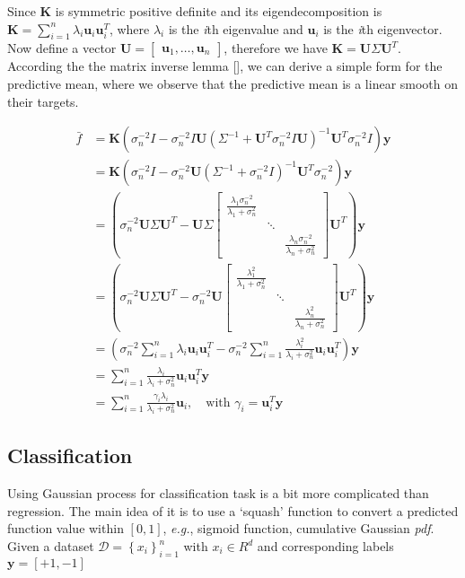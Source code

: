\documentclass{article}
\newcommand{\eg}{\emph{e.g.}}
\newcommand{\vct}[1]{\ensuremath{\boldsymbol{#1}}} %
\newcommand{\set}[1]{\ensuremath{\mathcal{#1}}}
\newcommand{\bmat}[1]{\begin{bmatrix}#1\end{bmatrix}}
\begin{document}
Since $ \vct K $ is symmetric positive definite and its eigendecomposition is $ \vct K=\sum_{i=1}^n \lambda_i\vct u_i \vct u_i^T$, where $ \lambda_i $ is the \textit{i}th eigenvalue and $ \vct u_i $ is the \textit{i}th eigenvector. Now define a vector $ \vct U=\bmat{\vct u_1, \ldots, \vct u_n} $, therefore we have $ \vct K = \vct U\Sigma\vct U^T $. According the the matrix inverse lemma [\cite{mil86}], we can derive a simple form for the predictive mean, where we observe that the predictive mean is a linear smooth on their targets. 

\begin{align*}
\bar{f} & = \vct K\left( \sigma_n^{-2}I - \sigma_n^{-2}I\vct U \left( \Sigma^{-1}+\vct U^T\sigma_n^{-2}I\vct U \right)^{-1}\vct U^T\sigma_n^{-2}I\right)\vct y \\
& = \vct K\left( \sigma_n^{-2}I - \sigma_n^{-2}\vct U \left( \Sigma^{-1}+\sigma_n^{-2}I \right)^{-1}\vct U^T\sigma_n^{-2}\right)\vct y \\
& = \left( \sigma_n^{-2}\vct U\Sigma\vct U^T - \vct U\Sigma
			\bmat{\frac{\lambda_1\sigma_n^{-2}}{\lambda_1+\sigma_n^{2}} & & \\ 
						& \ddots & \\ 
						& & \frac{\lambda_n\sigma_n^{-2}}{\lambda_n+\sigma_n^{2}}}
		\vct U^T \right)\vct y \\
& = \left( \sigma_n^{-2}\vct U\Sigma\vct U^T - \sigma_n^{-2}\vct U
\bmat{\frac{\lambda_1^2}{\lambda_1+\sigma_n^{2}} & & \\ 
	& \ddots & \\ 
	& & \frac{\lambda_n^2}{\lambda_n+\sigma_n^{2}}}
\vct U^T \right)\vct y \\
& = \left( \sigma_n^{-2}\sum_{i=1}^n\lambda_i\vct u_i\vct u_i^T - \sigma_n^{-2}\sum_{i=1}^n \frac{\lambda_i^{2}}{\lambda_i + \sigma_n^2}\vct u_i\vct u_i^T \right)\vct y \\
& = \sum_{i=1}^n \frac{\lambda_i}{\lambda_i + \sigma_n^2}\vct u_i\vct u_i^T\vct y \\
& = \sum_{i=1}^n \frac{\gamma_i\lambda_i}{\lambda_i + \sigma_n^2}\vct u_i, \quad \text{with } \gamma_i = \vct u_i^T\vct y
\end{align*}

\subsection{Classification}
Using Gaussian process for classification task is a bit more complicated than regression. The main idea of it is to use a `squash' function to convert a predicted function value within $\left[ 0, 1\right]$, \eg, sigmoid function, cumulative Gaussian \textit{pdf}. Given a dataset $\set D = \left\{x_i\right\}_{i=1}^n$ with $x_i \in R^d$ and corresponding labels $\vct y=\left[ +1,-1 \right] $
\end{document}
